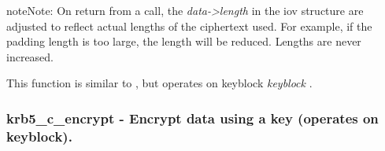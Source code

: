 \documentclass[letterpaper,10pt,english]{sphinxmanual}
\begin{document}


{\hyperref[appdev/refs/api/krb5_c_decrypt_iov:c.krb5_c_decrypt_iov]{}}



\begin{notice}{note}{Note:}
On return from a {\hyperref[appdev/refs/api/krb5_c_decrypt_iov:c.krb5_c_decrypt_iov]{}} call, the \emph{data-\textgreater{}length} in the iov structure are adjusted to reflect actual lengths of the ciphertext used. For example, if the padding length is too large, the length will be reduced. Lengths are never increased.

This function is similar to {\hyperref[appdev/refs/api/krb5_k_decrypt_iov:c.krb5_k_decrypt_iov]{}} , but operates on keyblock \emph{keyblock} .
\end{notice}


\subsubsection{krb5\_c\_encrypt -  Encrypt data using a key (operates on keyblock).}
\label{appdev/refs/api/krb5_c_encrypt::doc}\label{appdev/refs/api/krb5_c_encrypt:krb5-c-encrypt-encrypt-data-using-a-key-operates-on-keyblock}

\begin{fulllineitems}
\label{appdev/refs/api/krb5_c_encrypt:c.krb5_c_encrypt}
\end{fulllineitems}
\end{document}
